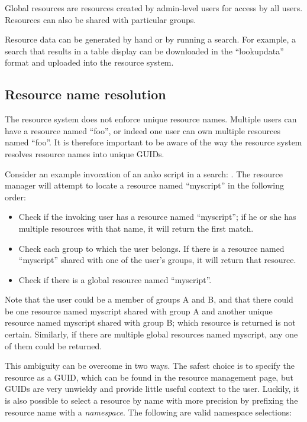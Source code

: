 Global resources are resources created by admin-level users for access
by all users. Resources can also be shared with particular groups.

Resource data can be generated by hand or by running a search. For
example, a search that results in a table display can be downloaded in
the ``lookupdata'' format and uploaded into the resource system.

\subsection{Resource name resolution}

The resource system does not enforce unique resource names. Multiple
users can have a resource named ``foo'', or indeed one user can own
multiple resources named ``foo''. It is therefore important to be aware of
the way the resource system resolves resource names into unique GUIDs.

Consider an example invocation of an anko script in a search: . The resource manager will attempt to locate a resource named
``myscript'' in the following order:

\begin{itemize}
\item
  Check if the invoking user has a resource named ``myscript''; if he
  or she has multiple resources with that name, it will return the first
  match.
\item
  Check each group to which the user belongs. If there is a resource
  named ``myscript'' shared with one of the user's groups, it will
  return that resource.
\item
  Check if there is a global resource named ``myscript''.
\end{itemize}

Note that the user could be a member of groups A and B, and that there
could be one resource named myscript shared with group A and another
unique resource named myscript shared with group B; which resource
is returned is not certain. Similarly, if there are multiple global
resources named myscript, any one of them could be returned.

This ambiguity can be overcome in two ways. The safest choice is to
specify the resource as a GUID, which can be found in the resource
management page, but GUIDs are very unwieldy and provide little useful
context to the user. Luckily, it is also possible to select a resource
by name with more precision by prefixing the resource name with a
\emph{namespace}. The following are valid namespace selections:

